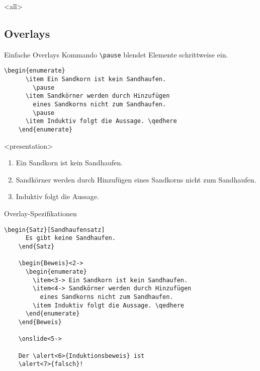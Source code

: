 \mode
<all>


\subsection{Overlays}

\begin{Frame}[fragile]{Einfache Overlays}
  Kommando \lstinline-\pause- blendet Elemente schrittweise ein.

  \begin{lstlisting}[gobble=4]
    \begin{enumerate}
      \item Ein Sandkorn ist kein Sandhaufen.
        \pause
      \item Sandkörner werden durch Hinzufügen
        eines Sandkorns nicht zum Sandhaufen.
        \pause
      \item Induktiv folgt die Aussage. \qedhere
    \end{enumerate}
  \end{lstlisting}

  \xxx
  
  \begin{onlyenv}<presentation>
    \begin{enumerate}
      \item Ein Sandkorn ist kein Sandhaufen.
        \pause
      \item Sandkörner werden durch Hinzufügen
        eines Sandkorns nicht zum Sandhaufen.
        \pause
      \item Induktiv folgt die Aussage. \qedhere
    \end{enumerate}
  \end{onlyenv}
\end{Frame}

\begin{Frame}[fragile]{Overlay-Spezifikationen}
  \begin{lstlisting}[gobble=4]
    \begin{Satz}[Sandhaufensatz]
      Es gibt keine Sandhaufen.
    \end{Satz}

    \begin{Beweis}<2->
      \begin{enumerate}
        \item<3-> Ein Sandkorn ist kein Sandhaufen.
        \item<4-> Sandkörner werden durch Hinzufügen
          eines Sandkorns nicht zum Sandhaufen.
        \item Induktiv folgt die Aussage. \qedhere
      \end{enumerate}
    \end{Beweis}

    \onslide<5->

    Der \alert<6>{Induktionsbeweis} ist
    \alert<7>{falsch}!
  \end{lstlisting}
\end{Frame}

